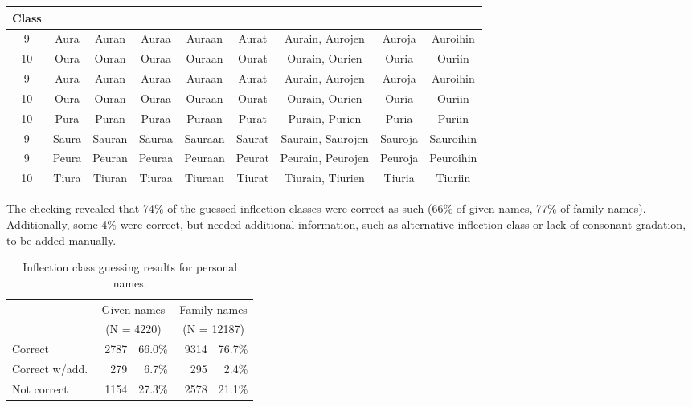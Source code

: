 \documentclass{llncs}
\begin{document}
\small
\begin{tabular}{c|c|c|c|c|c|c|c|c}
\hline
Class & & & & & & & & \\ \hline
9 & Aura & Auran & Auraa & Auraan & Aurat & Aurain, Aurojen & Auroja & Auroihin \\
10 & Oura & Ouran & Ouraa & Ouraan & Ourat & Ourain, Ourien & Ouria & Ouriin \\
9 & Aura & Auran & Auraa & Auraan & Aurat & Aurain, Aurojen & Auroja & Auroihin \\
10 & Oura & Ouran & Ouraa & Ouraan & Ourat & Ourain, Ourien & Ouria & Ouriin \\
10 & Pura & Puran & Puraa & Puraan & Purat & Purain, Purien & Puria & Puriin \\
9 & Saura & Sauran & Sauraa & Sauraan & Saurat & Saurain, Saurojen & Sauroja & Sauroihin \\
9 & Peura & Peuran & Peuraa & Peuraan & Peurat & Peurain, Peurojen & Peuroja & Peuroihin \\
10 & Tiura & Tiuran & Tiuraa & Tiuraan & Tiurat & Tiurain, Tiurien & Tiuria & Tiuriin \\
\hline
\end{tabular}
\normalsize

The checking revealed that 74\% of the guessed inflection classes were
correct as such (66\% of given names, 77\% of family
names). Additionally, some 4\% were correct, but needed additional
information, such as alternative inflection class or lack of consonant
gradation, to be added manually.

\begin{table}
\begin{center}
\begin{tabular}{l|rr|rr}
               & \multicolumn{2}{c|}{Given names}  & \multicolumn{2}{c}{Family names}\\
               & \multicolumn{2}{c|}{(N = 4220)}   & \multicolumn{2}{c}{(N = 12187)}\\
\hline
Correct        & ~2787  &  66.0\%  &    ~9314  &  76.7\%\\
Correct w/add. & ~~279  &   6.7\%  &    ~~295  &   2.4\%\\
Not correct    & ~1154  &  27.3\%  &    ~2578  &  21.1\%\\
\end{tabular}
\caption{Inflection class guessing results for personal names.}\label{tab:lang-id-acc}
\end{center}
\end{table}
\end{document}
